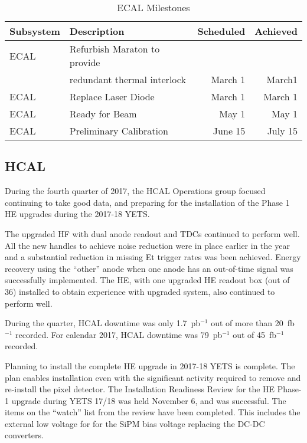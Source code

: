 \documentclass[12pt]{article}
\begin{document}
\begin{table}[htp]
\caption{ECAL Milestones}
\begin{center}
\begin{tabular}{|l|l|r|r|}
\hline
Subsystem&Description&Scheduled&Achieved\\
\hline
ECAL & Refurbish Maraton to provide& &\\
     & redundant thermal interlock &March 1& March1 \\
\hline
ECAL & Replace Laser Diode & March 1& March 1\\
\hline
ECAL & Ready for Beam& May 1& May  1 \\
\hline
ECAL & Preliminary Calibration& June 15& July 15 \\
\hline
\end{tabular}
\end{center}
\label{ECALMilestones}
\end{table}%

\newpage

\subsection{HCAL}


\vspace{2mm}


During the fourth quarter of 2017, the HCAL Operations group focused continuing to take good data, and preparing
for the installation of the Phase 1 HE upgrades during the 2017-18 YETS.

The upgraded HF with dual anode readout and TDCs continued
to perform well. 
All the new handles to achieve noise reduction were in place earlier in the year and a substantial reduction
in missing Et trigger rates was been achieved. Energy recovery using the ``other'' anode when one anode
has an out-of-time signal was successfully implemented. The HE, with one upgraded HE readout box (out of 36) installed
to obtain experience with upgraded system, also continued to perform well.


During the quarter, HCAL downtime was only 1.7~pb$^{-1}$ out of more than 20~fb$^{-1}$ recorded.
For calendar 2017, HCAL downtime was 79~pb$^{-1}$ out of 45~fb$^{-1}$ recorded.




Planning to install the complete HE upgrade in 2017-18 YETS is complete. 
The plan enables installation even with the significant activity required
to remove and re-install the pixel detector.
The Installation Readiness Review for the HE Phase-1 upgrade during
YETS 17/18 was held November 6, and was successful. The items on the ``watch'' list from the review
have been completed. This includes 
the external low voltage for for the SiPM bias voltage replacing the DC-DC converters.
\end{document}
